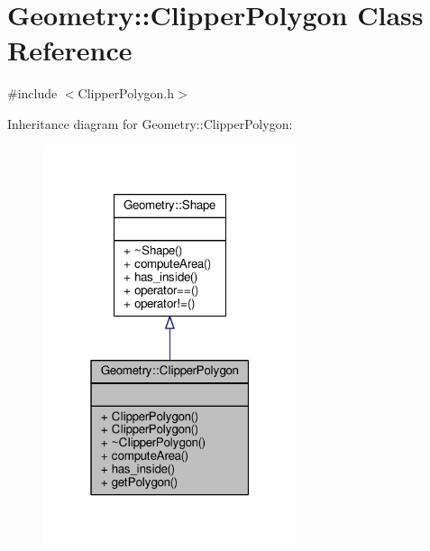 \hypertarget{classGeometry_1_1ClipperPolygon}{}\section{Geometry\+:\+:Clipper\+Polygon Class Reference}
\label{classGeometry_1_1ClipperPolygon}


{\ttfamily \#include $<$Clipper\+Polygon.\+h$>$}



Inheritance diagram for Geometry\+:\+:Clipper\+Polygon\+:\nopagebreak
\begin{figure}[H]
\begin{center}
\leavevmode
\includegraphics[width=211pt]{classGeometry_1_1ClipperPolygon__inherit__graph}
\end{center}
\end{figure}



